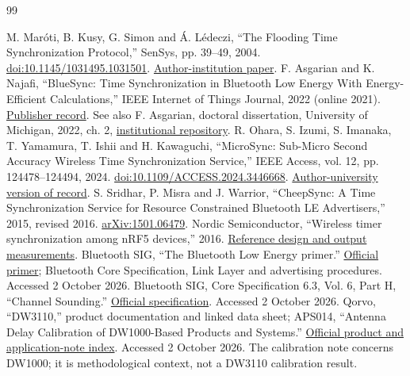 \documentclass[11pt,letterpaper]{article}
\newcommand{\page}{\clearpage}
\begin{document}
\page
\begin{thebibliography}{99}\small\raggedright
{} M. Mar\'oti, B. Kusy, G. Simon and \'A. L\'edeczi, ``The Flooding Time Synchronization Protocol,'' SenSys, pp. 39--49, 2004. \href{https://doi.org/10.1145/1031495.1031501}{doi:10.1145/1031495.1031501}. \href{https://archive.isis.vanderbilt.edu/sites/default/files/Maroti_M_11_3_2004_The_Floodi.pdf}{Author-institution paper}.
 F. Asgarian and K. Najafi, ``BlueSync: Time Synchronization in Bluetooth Low Energy With Energy-Efficient Calculations,'' IEEE Internet of Things Journal, 2022 (online 2021). \href{https://ieeexplore.ieee.org/document/9555832/}{Publisher record}. See also F. Asgarian, doctoral dissertation, University of Michigan, 2022, ch. 2, \href{https://deepblue.lib.umich.edu/handle/2027.42/174171}{institutional repository}.
 R. Ohara, S. Izumi, S. Imanaka, T. Yamamura, T. Ishii and H. Kawaguchi, ``MicroSync: Sub-Micro Second Accuracy Wireless Time Synchronization Service,'' IEEE Access, vol. 12, pp. 124478--124494, 2024. \href{https://doi.org/10.1109/ACCESS.2024.3446668}{doi:10.1109/ACCESS.2024.3446668}. \href{https://da.lib.kobe-u.ac.jp/da/kernel/0100491658/0100491658.pdf}{Author-university version of record}.
 S. Sridhar, P. Misra and J. Warrior, ``CheepSync: A Time Synchronization Service for Resource Constrained Bluetooth LE Advertisers,'' 2015, revised 2016. \href{https://arxiv.org/abs/1501.06479}{arXiv:1501.06479}.
 Nordic Semiconductor, ``Wireless timer synchronization among nRF5 devices,'' 2016. \href{https://devzone.nordicsemi.com/guides/short-range-guides/b/bluetooth-low-energy/posts/wireless-timer-synchronization-among-nrf5-devices}{Reference design and output measurements}.
 Bluetooth SIG, ``The Bluetooth Low Energy primer.'' \href{https://www.bluetooth.com/bluetooth-le-primer/}{Official primer}; Bluetooth Core Specification, Link Layer and advertising procedures. Accessed 2 October 2026.
 Bluetooth SIG, Core Specification 6.3, Vol. 6, Part H, ``Channel Sounding.'' \href{https://www.bluetooth.com/wp-content/uploads/Files/Specification/HTML/Core_v6.3/out/en/low-energy-controller/channel-sounding.html}{Official specification}. Accessed 2 October 2026.
 Qorvo, ``DW3110,'' product documentation and linked data sheet; APS014, ``Antenna Delay Calibration of DW1000-Based Products and Systems.'' \href{https://www.qorvo.com/products/p/DW3110}{Official product and application-note index}. Accessed 2 October 2026. The calibration note concerns DW1000; it is methodological context, not a DW3110 calibration result.

\end{thebibliography}
\end{document}
